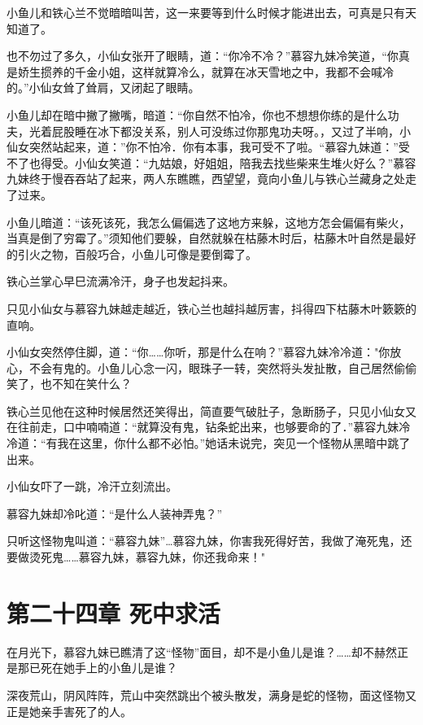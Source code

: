 \documentclass[12pt,oneside]{book}
\begin{document}
小鱼儿和铁心兰不觉暗暗叫苦，这一来要等到什么时候才能进出去，可真是只有天知道了。

也不勿过了多久，小仙女张开了眼睛，道：``你冷不冷？''慕容九妹冷笑道，``你真是娇生掼养的千金小姐，这样就算冷么，就算在冰天雪地之中，我都不会喊冷的。''小仙女耸了耸肩，又闭起了眼睛。

小鱼儿却在暗中撇了撇嘴，暗道：``你自然不怕冷，你也不想想你练的是什么功夫，光着屁股睡在冰下都没关系，别人可没练过你那鬼功夫呀。，又过了半响，小仙女突然站起来，道：''你不怕冷．你有本事，我可受不了啦。``慕容九妹道：''受不了也得受。小仙女笑道：``九姑娘，好姐姐，陪我去找些柴来生堆火好么？''慕容九妹终于慢吞吞站了起来，两人东瞧瞧，西望望，竟向小鱼儿与铁心兰藏身之处走了过来。

小鱼儿暗道：``该死该死，我怎么偏偏选了这地方来躲，这地方怎会偏偏有柴火，当真是倒了穷霉了。''须知他们要躲，自然就躲在枯藤木时后，枯藤木叶自然是最好的引火之物，百般巧合，小鱼儿可像是要倒霉了。

铁心兰掌心早巳流满冷汗，身子也发起抖来。

只见小仙女与慕容九妹越走越近，铁心兰也越抖越厉害，抖得四下枯藤木叶簌簌的直响。

小仙女突然停住脚，道：``你\ldots\ldots 你听，那是什么在响？''慕容九妹冷冷道："你放心，不会有鬼的。小鱼儿心念一闪，眼珠子一转，突然将头发扯散，自己居然偷偷笑了，也不知在笑什么？

铁心兰见他在这种时候居然还笑得出，简直要气破肚子，急断肠子，只见小仙女又在往前走，口中喃喃道：``就算没有鬼，钻条蛇出来，也够要命的了．''慕容九妹冷冷道：``有我在这里，你什么都不必怕。''她话未说完，突见一个怪物从黑暗中跳了出来。

小仙女吓了一跳，冷汗立刻流出。

慕容九妹却冷叱道：``是什么人装神弄鬼？''

只听这怪物鬼叫道：``慕容九妹''\ldots 慕容九妹，你害我死得好苦，我做了淹死鬼，还要做烫死鬼\ldots\ldots 慕容九妹，慕容九妹，你还我命来！"

\hypertarget{ux7b2cux4e8cux5341ux56dbux7ae0-ux6b7bux4e2dux6c42ux6d3b}{%
\chapter{第二十四章
死中求活}\label{ux7b2cux4e8cux5341ux56dbux7ae0-ux6b7bux4e2dux6c42ux6d3b}}

在月光下，慕容九妹已瞧清了这``怪物''面目，却不是小鱼儿是谁？\ldots\ldots 却不赫然正是那已死在她手上的小鱼儿是谁？

深夜荒山，阴风阵阵，荒山中突然跳出个被头散发，满身是蛇的怪物，面这怪物又正是她亲手害死了的人。
\end{document}
